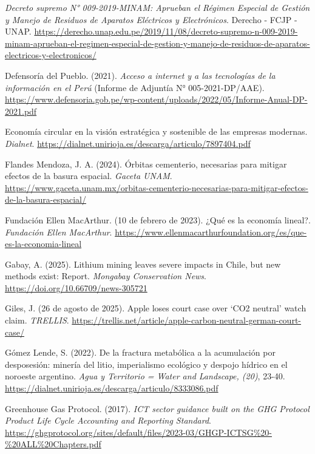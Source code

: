 \documentclass[stu,12pt,a4paper]{apa7}
\begin{document}
\begin{list}{}{
    \setlength{\leftmargin}{1.27cm}
    \setlength{\itemindent}{-1.27cm}  
    \setlength{\parsep}{0pt}       
    \setlength{\itemsep}{0.8em}      
}
\item \textit{Decreto supremo N° 009-2019-MINAM: Aprueban el Régimen Especial de Gestión y Manejo de Residuos de Aparatos Eléctricos y Electrónicos}. Derecho - FCJP - UNAP. \url{https://derecho.unap.edu.pe/2019/11/08/decreto-supremo-n-009-2019-minam-aprueban-el-regimen-especial-de-gestion-y-manejo-de-residuos-de-aparatos-electricos-y-electronicos/}

\item Defensoría del Pueblo. (2021). \textit{Acceso a internet y a las tecnologías de la información en el Perú} (Informe de Adjuntía N° 005-2021-DP/AAE). \url{https://www.defensoria.gob.pe/wp-content/uploads/2022/05/Informe-Anual-DP-2021.pdf}

\item Economía circular en la visión estratégica y sostenible de las empresas modernas. \textit{Dialnet}. \url{https://dialnet.unirioja.es/descarga/articulo/7897404.pdf}

\item Flandes Mendoza, J. A. (2024). Órbitas cementerio, necesarias para mitigar efectos de la basura espacial. \textit{Gaceta UNAM}. \url{https://www.gaceta.unam.mx/orbitas-cementerio-necesarias-para-mitigar-efectos-de-la-basura-espacial/}

\item Fundación Ellen MacArthur. (10 de febrero de 2023). ¿Qué es la economía lineal?. \textit{Fundación Ellen MacArthur}. \url{https://www.ellenmacarthurfoundation.org/es/que-es-la-economia-lineal}

\item Gabay, A. (2025). Lithium mining leaves severe impacts in Chile, but new methods exist: Report. \textit{Mongabay Conservation News}. \url{https://doi.org/10.66709/news-305721}

\item Giles, J. (26 de agosto de 2025). Apple loses court case over ‘CO2 neutral’ watch claim. \textit{TRELLIS}. \url{https://trellis.net/article/apple-carbon-neutral-german-court-case/}

\item Gómez Lende, S. (2022). De la fractura metabólica a la acumulación por desposesión: minería del litio, imperialismo ecológico y despojo hídrico en el noroeste argentino. \textit{Agua y Territorio = Water and Landscape, (20)}, 23-40. \url{https://dialnet.unirioja.es/descarga/articulo/8333086.pdf}

\item Greenhouse Gas Protocol. (2017). \textit{ICT sector guidance built on the GHG Protocol Product Life Cycle Accounting and Reporting Standard}. \url{https://ghgprotocol.org/sites/default/files/2023-03/GHGP-ICTSG%20-%20ALL%20Chapters.pdf}


\end{list}
\end{document}
